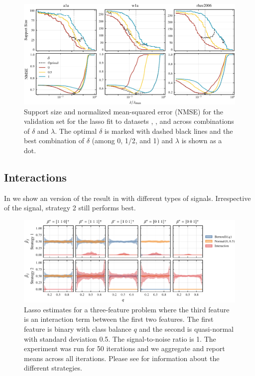 \begin{figure}[htpb]
  \centering
  \includegraphics[]{plots/hyperopt_paths.pdf}
  \caption{%
    Support size and normalized mean-squared error (NMSE) for the validation set for the lasso
    fit to datasets , , and  across combinations of
    \(\delta\) and \(\lambda\). The optimal \(\delta\) is marked with dashed black lines and
    the best combination of \(\delta\) (among 0, 1/2, and 1) and \(\lambda\) is shown as a dot.
  }
  \label{fig:hyperopt-support}
\end{figure}

\subsection{Interactions}%
\label{sec:additional-experiments-interactions}

In  we show an version of the result in 
with different types of signals. Irrespective of the signal, strategy 2 still performs
best.

\begin{figure}[htpb]
  \centering
  \includegraphics[]{plots/interactions-classbalance.pdf}
  \caption{%
    Lasso estimates for a three-feature problem where the third feature is an
    interaction term between the first two features. The first feature is
    binary with class balance \(q\) and the second is quasi-normal with
    standard deviation 0.5. The signal-to-noise ratio is 1. The experiment was
    run for 50 iterations and we aggregate and report means across all
    iterations. Please see  for information
    about the different strategies.
  }
  \label{fig:interactions-full}
\end{figure}

